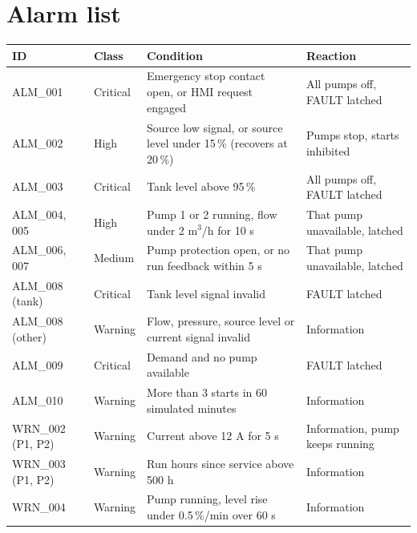 \documentclass[11pt,a4paper]{report}
\begin{document}
	\chapter{Alarm list}\label{app:alarms}
	\begin{longtable}{|p{2.3cm}|p{1.6cm}|p{6.2cm}|p{4.2cm}|}
		\hline
		ID & Class & Condition & Reaction \\
		\hline
		\endhead
		ALM\_001 & Critical & Emergency stop contact open, or HMI request engaged & All pumps off, FAULT latched \\
		ALM\_002 & High & Source low signal, or source level under 15\,\% (recovers at 20\,\%) & Pumps stop, starts inhibited \\
		ALM\_003 & Critical & Tank level above 95\,\% & All pumps off, FAULT latched \\
		ALM\_004, 005 & High & Pump 1 or 2 running, flow under 2 m$^3$/h for 10 s & That pump unavailable, latched \\
		ALM\_006, 007 & Medium & Pump protection open, or no run feedback within 5 s & That pump unavailable, latched \\
		ALM\_008 (tank) & Critical & Tank level signal invalid & FAULT latched \\
		ALM\_008 (other) & Warning & Flow, pressure, source level or current signal invalid & Information \\
		ALM\_009 & Critical & Demand and no pump available & FAULT latched \\
		ALM\_010 & Warning & More than 3 starts in 60 simulated minutes & Information \\
		WRN\_002 (P1, P2) & Warning & Current above 12 A for 5 s & Information, pump keeps running \\
		WRN\_003 (P1, P2) & Warning & Run hours since service above 500 h & Information \\
		WRN\_004 & Warning & Pump running, level rise under 0.5\,\%/min over 60 s & Information \\
		\hline
	\end{longtable}
	
	
\end{document}
